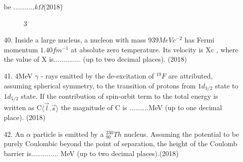 \documentclass[journal]{IEEEtran}
\begin{document}
\begin{enumerate}
    be ...........$k\Omega$\hfill (2018)
    \begin{figure}[!ht]
        \centering
        \caption{3}
    \end{figure}
    \item[40.] Inside a large nucleus, a nucleon with mass $939 MeVc^{-2}$ has Fermi momentum $1.40 fm^{-1}$
    at absolute zero temperature. Its velocity is Xc , where the value of X is.............. (up
    to two decimal places). \hfill (2018)
    \item[41.] 4MeV $\gamma$ - rays emitted by the de-excitation of $^{19}F$ are attributed, assuming spherical
    symmetry, to the transition of protons from $1d_{3/2}$ state to $1d_{5/2}$ state. If the contribution
    of spin-orbit term to the total energy is written as C$\langle \overrightarrow{l}.\overrightarrow{s}\rangle$
    the magnitude of C is ..........MeV (up to one decimal place). \hfill (2018)
    \item[42.] An  $\alpha$ particle is emitted by a $^{230}_{90}Th$ nucleus. Assuming the potential to be purely
    Coulombic beyond the point of separation, the height of the Coulomb barrier is.............. MeV (up to two decimal places).\hfill (2018)
\end{enumerate}
\end{document}

